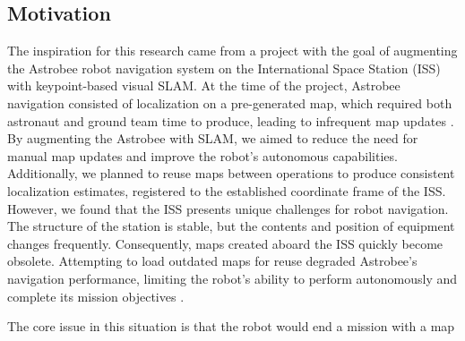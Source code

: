 \subsection{Motivation}


The inspiration for this research came from a project with the goal of augmenting the Astrobee robot navigation system on the International Space Station (ISS) with keypoint-based visual SLAM. At the time of the project, Astrobee navigation consisted of localization on a pre-generated map, which required both astronaut and ground team time to produce, leading to infrequent map updates \cite{soussanAstroLocEfficientRobust2022}. By augmenting the Astrobee with SLAM, we aimed to reduce the need for manual map updates and improve the robot's autonomous capabilities. Additionally, we planned to reuse maps between operations to produce consistent localization estimates, registered to the established coordinate frame of the ISS. However, we found that the ISS presents unique challenges for robot navigation. The structure of the station is stable, but the contents and position of equipment changes frequently. Consequently, maps created aboard the ISS quickly become obsolete. Attempting to load outdated maps for reuse degraded Astrobee's navigation performance, limiting the robot's ability to perform autonomously and complete its mission objectives \cite{ALCMM}.


The core issue in this situation is that the robot would end a mission with a map

